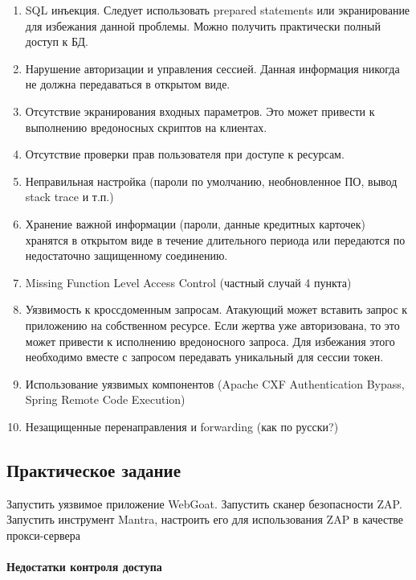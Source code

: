 \documentclass{article}
\begin{document}
\begin{enumerate}
\item SQL инъекция. Следует использовать prepared statements или экранирование для избежания данной проблемы. Можно получить практически полный доступ к БД.
\item Нарушение авторизации и управления сессией. Данная информация никогда не должна передаваться в открытом виде.
\item Отсутствие экранирования входных параметров. Это может привести к выполнению вредоносных скриптов на клиентах.
\item Отсутствие проверки прав пользователя при доступе к ресурсам.
\item Неправильная настройка (пароли по умолчанию, необновленное ПО, вывод stack trace и т.п.)
\item Хранение важной информации (пароли, данные кредитных карточек) хранятся в открытом виде в течение длительного периода или передаются по недостаточно защищенному соединению.
\item Missing Function Level Access Control (частный случай 4 пункта)
\item Уязвимость к кроссдоменным запросам. Атакующий может вставить запрос к приложению на собственном ресурсе. Если жертва уже авторизована, то это может привести к исполнению вредоносного запроса. Для избежания этого необходимо вместе с запросом передавать уникальный для сессии токен.
\item Использование уязвимых компонентов (Apache CXF Authentication Bypass, Spring Remote Code Execution)
\item Незащищенные перенаправления и forwarding (как по русски?)
\end{enumerate}

\subsection{Практическое задание}

Запустить уязвимое приложение WebGoat. Запустить сканер безопасности ZAP. Запустить инструмент Mantra, настроить его для использования ZAP в качестве прокси-сервера
\paragraph{Недостатки контроля доступа}
~
\end{document}
